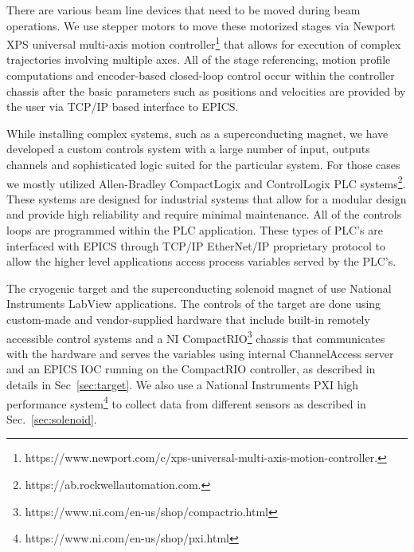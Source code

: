 There are various beam line devices that need to be moved during beam operations. We use stepper motors to move these motorized stages via Newport XPS universal multi-axis motion controller\footnote{https://www.newport.com/c/xps-universal-multi-axis-motion-controller.} that allows for execution of complex trajectories involving multiple axes. All of the stage referencing, motion profile computations and encoder-based closed-loop control occur within the controller chassis after the basic parameters such as positions and velocities are provided by the user via TCP/IP based interface to EPICS.   

While installing complex systems, such as a superconducting magnet, we have developed a custom controls system with a large number of input, outputs channels and sophisticated logic suited for the particular system. For those cases we mostly  utilized Allen-Bradley CompactLogix and ControlLogix PLC systems\footnote{https://ab.rockwellautomation.com.}. These systems are designed for industrial systems that allow for a modular design and provide high reliability and require minimal maintenance. All of the controls loops are programmed within the PLC application. These types of PLC's are interfaced with EPICS through TCP/IP EtherNet/IP proprietary protocol to allow the higher level applications access process variables served by the PLC's.  

The cryogenic target and the superconducting solenoid magnet of \gx{} use National Instruments LabView applications. The controls of the target are done using custom-made and vendor-supplied hardware that include built-in remotely accessible control systems and a NI CompactRIO\footnote{https://www.ni.com/en-us/shop/compactrio.html} chassis that communicates with the hardware and serves the variables using internal ChannelAccess server and an EPICS IOC running on the CompactRIO controller, as described in details in Sec~\ref{sec:target}. We also use a National Instruments PXI high performance system\footnote{https://www.ni.com/en-us/shop/pxi.html} to collect data from different sensors as described in Sec.~\ref{sec:solenoid}. 

